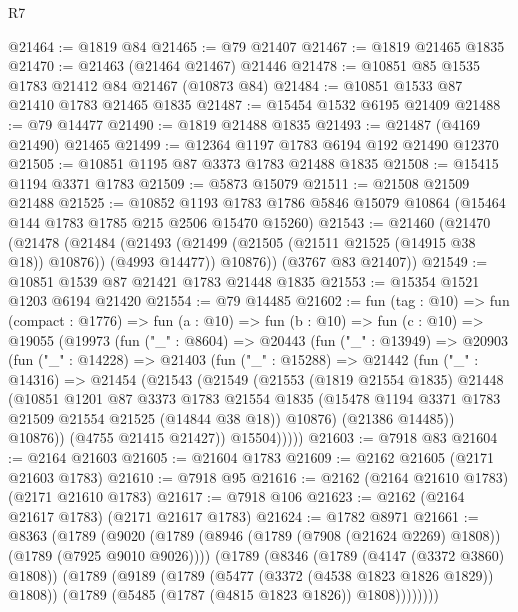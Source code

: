 \begin{lexlean}{R7}
\begin{coremodule}
@21464 := @1819 @84
@21465 := @79 @21407
@21467 := @1819 @21465 @1835
@21470 := @21463 (@21464 @21467) @21446
@21478 := @10851 @85 @1535 @1783 @21412 @84 @21467 (@10873 @84)
@21484 := @10851 @1533 @87 @21410 @1783 @21465 @1835
@21487 := @15454 @1532 @6195 @21409
@21488 := @79 @14477
@21490 := @1819 @21488 @1835
@21493 := @21487 (@4169 @21490) @21465
@21499 := @12364 @1197 @1783 @6194 @192 @21490 @12370
@21505 := @10851 @1195 @87 @3373 @1783 @21488 @1835
@21508 := @15415 @1194 @3371 @1783
@21509 := @5873 @15079
@21511 := @21508 @21509 @21488
@21525 := @10852
    @1193
    @1783
    @1786
    @5846
    @15079
    @10864
    (@15464 @144 @1783 @1785 @215 @2506 @15470 @15260)
@21543 := @21460
    (@21470
      (@21478
        (@21484
          (@21493 (@21499 (@21505 (@21511 @21525 (@14915 @38 @18)) @10876)) (@4993 @14477))
          @10876))
      (@3767 @83 @21407))
@21549 := @10851 @1539 @87 @21421 @1783 @21448 @1835
@21553 := @15354 @1521 @1203 @6194 @21420
@21554 := @79 @14485
@21602 := fun (tag : @10) =>
  fun (compact : @1776) =>
  fun (a : @10) =>
  fun (b : @10) =>
  fun (c : @10) =>
  @19055
    (@19973
      (fun ("_" : @8604) =>
      @20443
        (fun ("_" : @13949) =>
        @20903
          (fun ("_" : @14228) =>
          @21403
            (fun ("_" : @15288) =>
            @21442
              (fun ("_" : @14316) =>
              @21454
                (@21543
                  (@21549
                    (@21553
                      (@1819 @21554 @1835)
                      @21448
                      (@10851
                        @1201
                        @87
                        @3373
                        @1783
                        @21554
                        @1835
                        (@15478 @1194 @3371 @1783 @21509 @21554 @21525 (@14844 @38 @18))
                        @10876)
                      (@21386 @14485))
                    @10876))
                (@4755 @21415 @21427))
              @15504)))))
@21603 := @7918 @83
@21604 := @2164 @21603
@21605 := @21604 @1783
@21609 := @2162 @21605 (@2171 @21603 @1783)
@21610 := @7918 @95
@21616 := @2162 (@2164 @21610 @1783) (@2171 @21610 @1783)
@21617 := @7918 @106
@21623 := @2162 (@2164 @21617 @1783) (@2171 @21617 @1783)
@21624 := @1782 @8971
@21661 := @8363
    (@1789
      (@9020
        (@1789 (@8946 (@1789 (@7908 (@21624 @2269) @1808)) (@1789 (@7925 @9010 @9026))))
        (@1789
          (@8346
            (@1789 (@4147 (@3372 @3860) @1808))
            (@1789
              (@9189
                (@1789 (@5477 (@3372 (@4538 @1823 @1826 @1829)) @1808))
                (@1789 (@5485 (@1787 (@4815 @1823 @1826)) @1808))))))))

\end{coremodule}
\end{lexlean}

